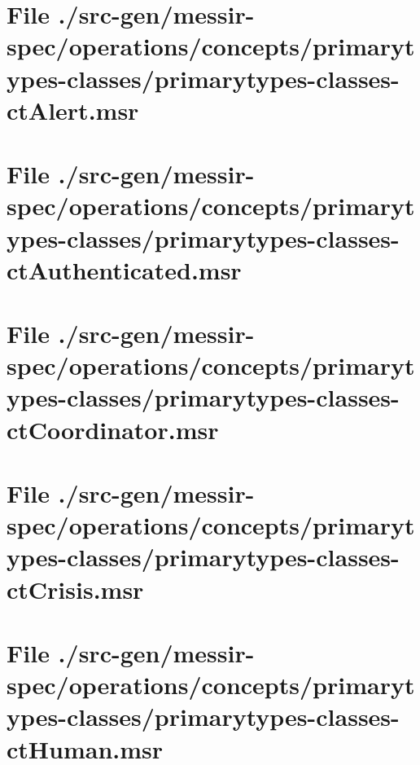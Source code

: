 \section[File /src-gen/messir-spec/operations.../primarytypes-classes-ctAlert.msr]{File ./src-gen/messir-spec/operations/concepts/primarytypes-classes/primarytypes-classes-ctAlert.msr}
\scriptsize

\normalsize
	
\section[File /src-gen/messir-spec.../primarytypes-classes-ctAuthenticated.msr]{File ./src-gen/messir-spec/operations/concepts/primarytypes-classes/primarytypes-classes-ctAuthenticated.msr}
\scriptsize

\normalsize
	
\section[File /src-gen/messir-spec/operations.../primarytypes-classes-ctCoordinator.msr]{File ./src-gen/messir-spec/operations/concepts/primarytypes-classes/primarytypes-classes-ctCoordinator.msr}
\scriptsize

\normalsize
	
\section[File /src-gen/messir-spec/operations.../primarytypes-classes-ctCrisis.msr]{File ./src-gen/messir-spec/operations/concepts/primarytypes-classes/primarytypes-classes-ctCrisis.msr}
\scriptsize

\normalsize
	
\section[File /src-gen/messir-spec/operations.../primarytypes-classes-ctHuman.msr]{File ./src-gen/messir-spec/operations/concepts/primarytypes-classes/primarytypes-classes-ctHuman.msr}
\scriptsize

\normalsize
	
